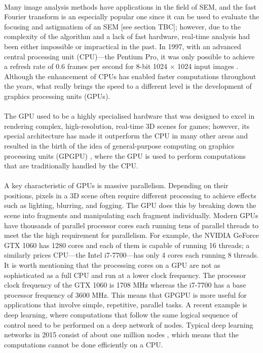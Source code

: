 \documentclass[12pt, twocolumn]{report}
\begin{document}
\paragraph{}
Many image analysis methods have applications in the field of SEM, and the fast Fourier transform is an especially popular one since it can be used to evaluate the focusing and astigmatism of an SEM [see section TBC]; however, due to the complexity of the algorithm and a lack of fast hardware, real-time analysis had been either impossible or impractical in the past. In 1997, with an advanced central processing unit (CPU)---the Pentium Pro, it was only possible to achieve a refresh rate of 0.6 frames per second for 8-bit 1024 $\times$ 1024 input images \cite{SEM image sharpness measurement}. Although the enhancement of CPUs has enabled faster computations throughout the years, what really brings the speed to a different level is the development of graphics processing units (GPUs).

\paragraph{}
The GPU used to be a highly specialised hardware that was designed to excel in rendering complex, high-resolution, real-time 3D scenes for games; however, its special architecture has made it outperform the CPU in many other areas and resulted in the birth of the idea of general-purpose computing on graphics processing units (GPGPU) \cite{GPU computing}, where the GPU is used to perform computations that are traditionally handled by the CPU.

\paragraph{}
A key characteristic of GPUs is massive parallelism. Depending on their positions, pixels in a 3D scene often require different processing to achieve effects such as lighting, blurring, and fogging. The GPU does this by breaking down the scene into fragments and manipulating each fragment individually. Modern GPUs have thousands of parallel processor cores each running tens of parallel threads to meet the the high requirement for parallelism. For example, the NVIDIA GeForce GTX 1060 has 1280 cores and each of them is capable of running 16 threads; a similarly prices CPU---the Intel i7-7700---has only 4 cores each running 8 threads. It is worth mentioning that the processing cores on a GPU are not as sophisticated as a full CPU and run at a lower clock frequency. The processor clock frequency of the GTX 1060 is 1708 MHz whereas the i7-7700 has a base processor frequency of 3600 MHz. This means that GPGPU is more useful for applications that involve simple, repetitive, parallel tasks. A recent example is deep learning, where computations that follow the same logical sequence of control need to be performed on a deep network of nodes. Typical deep learning networks in 2015 consist of about one million nodes \cite{Deep learning}, which means that the computations cannot be done efficiently on a CPU.
\end{document}
